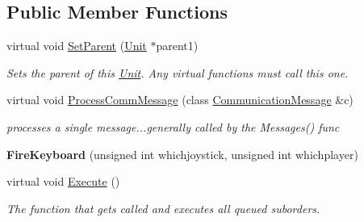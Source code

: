 \subsection*{Public Member Functions}
\begin{DoxyCompactItemize}
\item 
virtual void \hyperlink{classFireKeyboard_ab5fbb465ea0db4b996b5aa851cae383b}{Set\+Parent} (\hyperlink{classUnit}{Unit} $\ast$parent1)\hypertarget{classFireKeyboard_ab5fbb465ea0db4b996b5aa851cae383b}{}\label{classFireKeyboard_ab5fbb465ea0db4b996b5aa851cae383b}

\begin{DoxyCompactList}\small\item\em Sets the parent of this \hyperlink{classUnit}{Unit}. Any virtual functions must call this one. \end{DoxyCompactList}\item 
virtual void \hyperlink{classFireKeyboard_a86c7bba2cd1fd67c7113480a868a1d11}{Process\+Comm\+Message} (class \hyperlink{classCommunicationMessage}{Communication\+Message} \&c)\hypertarget{classFireKeyboard_a86c7bba2cd1fd67c7113480a868a1d11}{}\label{classFireKeyboard_a86c7bba2cd1fd67c7113480a868a1d11}

\begin{DoxyCompactList}\small\item\em processes a single message...generally called by the Messages() func \end{DoxyCompactList}\item 
{\bfseries Fire\+Keyboard} (unsigned int whichjoystick, unsigned int whichplayer)\hypertarget{classFireKeyboard_a302cde707c87104a89e027b273e01b55}{}\label{classFireKeyboard_a302cde707c87104a89e027b273e01b55}

\item 
virtual void \hyperlink{classFireKeyboard_a383506e379691f1c8116a9cd89f5aaaf}{Execute} ()\hypertarget{classFireKeyboard_a383506e379691f1c8116a9cd89f5aaaf}{}\label{classFireKeyboard_a383506e379691f1c8116a9cd89f5aaaf}

\begin{DoxyCompactList}\small\item\em The function that gets called and executes all queued suborders. \end{DoxyCompactList}\end{DoxyCompactItemize}
